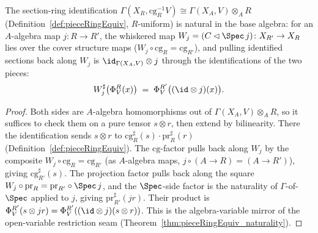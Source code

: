\begin{theorem}
  \label{thm:pieceRingEquiv_whiskerLeft_naturality}
  \leanok
  The section-ring identification \(\Gamma(X_R, \mathrm{cg}_R^{-1}V) \cong \Gamma(X_A, V)
  \otimes_A R\) (Definition~\ref{def:pieceRingEquiv}, \(R\)-uniform) is natural in the base algebra:
  for an \(A\)-algebra map \(j \colon R \to R'\), the whiskered map \(W_j = (C \lhd \Spec\, j) \colon
  X_{R'} \to X_R\) lies over the cover structure maps (\(W_j \circ \mathrm{cg}_R = \mathrm{cg}_{R'}\)),
  and pulling identified sections back along \(W_j\) is \(\id_{\Gamma(X_A, V)} \otimes j\) through the
  identifications of the two pieces:
  \[
    W_j^{\sharp}\bigl(\Phi^R_V(x)\bigr) \;=\; \Phi^{R'}_V\bigl((\id \otimes j)(x)\bigr) .
  \]
\end{theorem}
\begin{proof}
  \leanok
  Both sides are \(A\)-algebra homomorphisms out of \(\Gamma(X_A, V) \otimes_A R\), so it suffices to
  check them on a pure tensor \(s \otimes r\), then extend by bilinearity. There the identification
  sends \(s \otimes r\) to \(\mathrm{cg}_R^{\sharp}(s) \cdot \mathrm{pr}_R^{\sharp}(r)\)
  (Definition~\ref{def:pieceRingEquiv}). The \(\mathrm{cg}\)-factor pulls back along \(W_j\) by the
  composite \(W_j \circ \mathrm{cg}_R = \mathrm{cg}_{R'}\) (as \(A\)-algebra maps, \(j \circ (A \to R)
  = (A \to R')\)), giving \(\mathrm{cg}_{R'}^{\sharp}(s)\). The projection factor pulls back along the
  square \(W_j \circ \mathrm{pr}_R = \mathrm{pr}_{R'} \circ \Spec\, j\), and the \(\Spec\)-side factor
  is the naturality of \(\Gamma\)-of-\(\Spec\) applied to \(j\), giving \(\mathrm{pr}_{R'}^{\sharp}(j
  r)\). Their product is \(\Phi^{R'}_V(s \otimes j r) = \Phi^{R'}_V((\id \otimes j)(s \otimes r))\).
  This is the algebra-variable mirror of the open-variable restriction seam
  (Theorem~\ref{thm:pieceRingEquiv_naturality}).
\end{proof}


